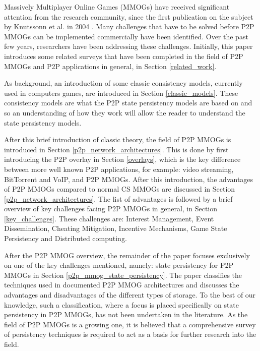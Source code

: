 \documentclass[10pt,a4paper,journal,cspaper,compsoc]{IEEEtran}
\begin{document}
%
%
%
%
 Massively Multiplayer Online Games (MMOGs) have received significant attention from the research community, since
the first publication on the subject by Knutssonn et al. in 2004 \cite{knutsson_p2p_first}. Many challenges that have to be solved before P2P MMOGs
can be implemented commercially have been identified. Over the past few years, researchers have been addressing these challenges. Initially, this
paper introduces some related surveys that have been completed in the field of P2P MMOGs and P2P applications in general, in Section
\ref{related_work}.

As background, an introduction of some classic consistency models, currently used in computers games, are introduced in Section \ref{classic_models}.
These consistency models are what the P2P state persistency models are based on and so an understanding of how they work will allow the reader to
understand the state persistency models.

After this brief introduction of classic theory, the field of P2P MMOGs is introduced in Section \ref{p2p_network_architectures}. This is done by
first introducing the P2P overlay in Section \ref{overlays}, which is the key difference between more well known P2P applications, for example: video
streaming, BitTorrent and VoIP, and P2P MMOGs. After this introduction, the advantages of P2P MMOGs compared to normal \ac{CS} MMOGs are discussed in
Section \ref{p2p_network_architectures}. The list of advantages is followed by a brief overview of key challenges facing P2P MMOGs in general, in
Section \ref{key_challenges}. These challenges are: Interest Management, Event Dissemination, Cheating Mitigation, Incentive Mechanisms, Game State
Persistency and Distributed computing.

After the P2P MMOG overview, the remainder of the paper focuses exclusively on one of the key challenges mentioned, namely: state persistency for P2P
MMOGs in Section \ref{p2p_mmog_state_persistency}. The paper classifies the techniques used in documented P2P MMOG architectures and discusses the
advantages and disadvantages of the different types of storage. To the best of our knowledge, such a classification, where a focus is placed
specifically on state persistency in P2P MMOGs, has not been undertaken in the literature. As the field of P2P MMOGs is a growing one, it is believed
that a comprehensive survey of persistency techniques is required to act as a basis for further research into the field.
\end{document}
